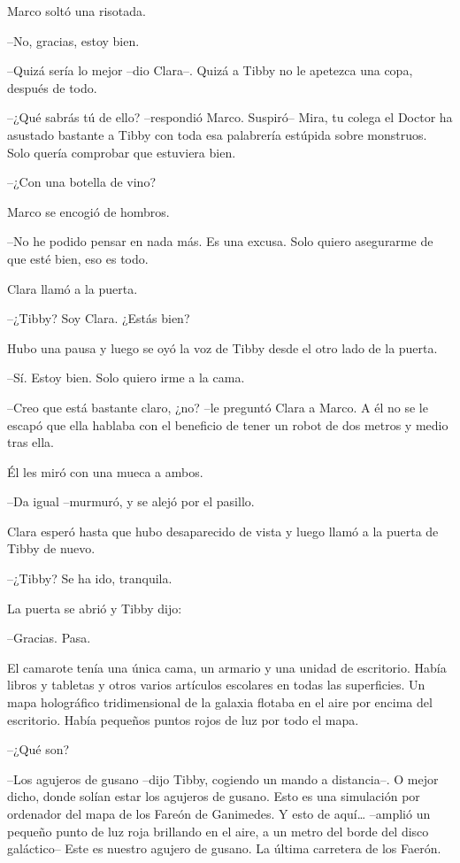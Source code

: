 {Marco soltó una risotada.}

{--No, gracias, estoy bien.}

{--Quizá sería lo mejor --dio Clara--. Quizá a Tibby no le apetezca una
copa, después de todo.}

{--¿Qué sabrás tú de ello? --respondió Marco. Suspiró-- Mira, tu colega
 el Doctor ha asustado bastante a Tibby con toda esa palabrería estúpida
sobre monstruos. Solo quería comprobar que estuviera bien.}

{--¿Con una botella de vino?}

{Marco se encogió de hombros.}

{--No he podido pensar en nada más. Es una excusa. Solo quiero asegurarme
de que esté bien, eso es todo.}

{Clara llamó a la puerta.}

{--¿Tibby? Soy Clara. ¿Estás bien?}

{Hubo una pausa y luego se oyó la voz de Tibby desde el otro lado de la
puerta.}

{--Sí. Estoy bien. Solo quiero irme a la cama.}

{--Creo que está bastante claro, ¿no? --le preguntó Clara a Marco. A él
 no se le escapó que ella hablaba con el beneficio de tener un robot de
dos metros y medio tras ella.}

{Él les miró con una mueca a ambos.}

{--Da igual --murmuró, y se alejó por el pasillo.}

{Clara esperó hasta que hubo desaparecido de vista y luego llamó a la
puerta de Tibby de nuevo.}

{--¿Tibby? Se ha ido, tranquila.}

{La puerta se abrió y Tibby dijo:}

{--Gracias. Pasa.}

{El camarote tenía una única cama, un armario y una unidad de escritorio.
 Había libros y tabletas y otros varios artículos escolares en todas las
 superficies. Un mapa holográfico tridimensional de la galaxia flotaba en
 el aire por encima del escritorio. Había pequeños puntos rojos de luz
por todo el mapa.}

{--¿Qué son?}

{--Los agujeros de gusano --dijo Tibby, cogiendo un mando a distancia--.
 O mejor dicho, donde solían estar los agujeros de gusano. Esto es una
 simulación por ordenador del mapa de los Fareón de Ganimedes. Y esto de
 aquí\ldots{} --amplió un pequeño punto de luz roja brillando en el aire,
 a un metro del borde del disco galáctico-- Este es nuestro agujero de
gusano. La última carretera de los Faerón.}

